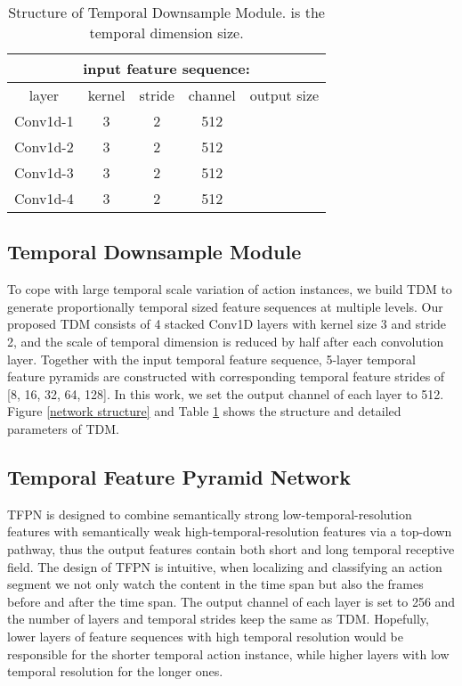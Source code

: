\documentclass[final]{cvpr}
\begin{document}
\begin{table}[htbp]
    \caption{Structure of Temporal Downsample Module.  is the temporal dimension size.}
    \centering
    \begin{tabular} { c | c c c | c }
        \toprule
        \multicolumn{5}{c}{input feature sequence: }\\
        \midrule
        layer & kernel & stride & channel & output size\\
        \midrule
        Conv1d-1 & 3 & 2 & 512 &  \\
        \midrule
        Conv1d-2 & 3 & 2 & 512 &  \\
        \midrule
        Conv1d-3 & 3 & 2 & 512 &  \\
        \midrule
        Conv1d-4 & 3 & 2 & 512 &  \\

        \bottomrule
    \end{tabular}
    \label{tab:TDM}
\end{table}

\subsection{Temporal Downsample Module}
To cope with large temporal scale variation of action instances, we build TDM to generate proportionally temporal sized feature sequences at multiple levels. Our proposed TDM consists of 4 stacked Conv1D layers with kernel size 3 and stride 2, and the scale of temporal dimension is reduced by half after each convolution layer. Together with the input temporal feature sequence, 5-layer temporal feature pyramids are constructed with corresponding temporal feature strides of [8, 16, 32, 64, 128]. In this work, we set the output channel of each layer to 512. Figure \ref{network structure} and Table \ref{tab:TDM} shows the structure and detailed parameters of TDM.
 
\subsection{Temporal Feature Pyramid Network}
TFPN is designed to combine semantically strong low-temporal-resolution features with semantically weak high-temporal-resolution features via a top-down pathway, thus the output features contain both short and long temporal  receptive field. The design of TFPN is intuitive, when localizing and classifying an action segment we not only watch the content in the time span but also the frames before and after the time span.
The output channel of each layer is set to 256 and the number of layers and temporal strides keep the same as TDM. Hopefully, lower layers of feature sequences with high temporal resolution would be responsible for the shorter temporal action instance, while higher layers with low temporal resolution for the longer ones. 
\end{document}
